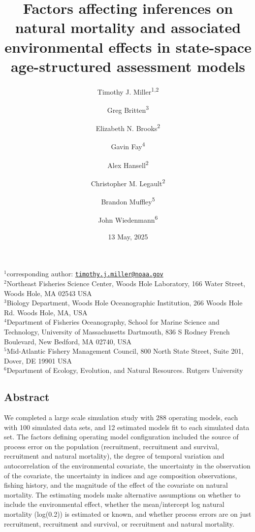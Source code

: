 \documentclass[
  12pt,
]{article}
\title{Factors affecting inferences on natural mortality and associated environmental effects in state-space age-structured assessment models}
\author{Timothy J. Miller\textsuperscript{1,2} \and Greg Britten\textsuperscript{3} \and Elizabeth N. Brooks\textsuperscript{2} \and Gavin Fay\textsuperscript{4} \and Alex Hansell\textsuperscript{2} \and Christopher M. Legault\textsuperscript{2} \and Brandon Muffley\textsuperscript{5} \and John Wiedenmann\textsuperscript{6}}
\date{13 May, 2025}
\begin{document}
\maketitle

\(^1\)corresponding author: \href{mailto:timothy.j.miller@noaa.gov}{\nolinkurl{timothy.j.miller@noaa.gov}}\\
\(^2\)Northeast Fisheries Science Center, Woods Hole Laboratory, 166 Water Street, Woods Hole, MA 02543 USA\\
\(^3\)Biology Department, Woods Hole Oceanographic Institution, 266 Woods Hole Rd. Woods Hole, MA, USA\\
\(^4\)Department of Fisheries Oceanography, School for Marine Science and Technology, University of Massachusetts Dartmouth, 836 S Rodney French Boulevard, New Bedford, MA 02740, USA\\
\(^5\)Mid-Atlantic Fishery Management Council, 800 North State Street, Suite 201, Dover, DE 19901 USA\\
\(^6\)Department of Ecology, Evolution, and Natural Resources. Rutgers University\\

\pagebreak

\hypertarget{abstract}{%
\subsection*{Abstract}\label{abstract}}

We completed a large scale simulation study with 288 operating models, each with 100 simulated data sets, and 12 estimated models fit to each simulated data set. The factors defining operating model configuration included the source of process error on the population (recruitment, recruitment and survival, recruitment and natural mortality), the degree of temporal variation and autocorrelation of the environmental covariate, the uncertainty in the observation of the covariate, the uncertainty in indices and age composition observations, fishing history, and the magnitude of the effect of the covariate on natural mortality. The estimating models make alternative assumptions on whether to include the environmental effect, whether the mean/intercept log natural mortality (log(0.2)) is estimated or known, and whether process errors are on just recruitment, recruitment and survival, or recruitment and natural mortality.
\end{document}
